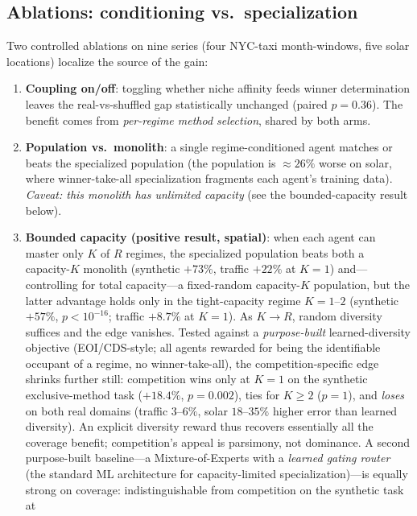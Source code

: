 \documentclass[11pt,a4paper]{article}
\theoremstyle{definition}
\theoremstyle{plain}
\begin{document}
\subsection{Ablations: conditioning vs.\ specialization}

Two controlled ablations on nine series (four NYC-taxi month-windows, five solar
locations) localize the source of the gain:

\begin{enumerate}
    \item \textbf{Coupling on/off}: toggling whether niche affinity feeds winner
    determination leaves the real-vs-shuffled gap statistically unchanged (paired
    $p = 0.36$). The benefit comes from \emph{per-regime method selection}, shared
    by both arms.
    \item \textbf{Population vs.\ monolith}: a single regime-conditioned agent
    matches or beats the specialized population (the population is $\approx 26\%$
    worse on solar, where winner-take-all specialization fragments each agent's
    training data). \emph{Caveat: this monolith has unlimited capacity} (see the
    bounded-capacity result below).
    \item \textbf{Bounded capacity (positive result, spatial)}: when each agent
    can master only $K$ of $R$ regimes, the specialized population beats both a
    capacity-$K$ monolith (synthetic $+73\%$, traffic $+22\%$ at $K{=}1$) and---
    controlling for total capacity---a fixed-random capacity-$K$ population, but
    the latter advantage holds only in the tight-capacity regime $K{=}1$--$2$
    (synthetic $+57\%$, $p<10^{-16}$; traffic $+8.7\%$ at $K{=}1$). As $K \to R$,
    random diversity suffices and the edge vanishes. Tested against a
    \emph{purpose-built} learned-diversity objective (EOI/CDS-style; all agents
    rewarded for being the identifiable occupant of a regime, no winner-take-all),
    the competition-specific edge shrinks further still: competition wins only at
    $K{=}1$ on the synthetic exclusive-method task ($+18.4\%$, $p{=}0.002$), ties
    for $K\geq2$ ($p{=}1$), and \emph{loses} on both real domains (traffic
    $3$--$6\%$, solar $18$--$35\%$ higher error than learned diversity). An
    explicit diversity reward thus recovers essentially all the coverage benefit;
    competition's appeal is parsimony, not dominance. A second purpose-built
    baseline---a Mixture-of-Experts with a \emph{learned gating router} (the
    standard ML architecture for capacity-limited specialization)---is equally
    strong on coverage: indistinguishable from competition on the synthetic task at

\end{enumerate}
\end{document}
